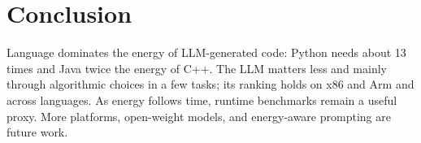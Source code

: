 \section{Conclusion}
\label{sec:conclusion}

Language dominates the energy of LLM-generated code: Python needs about 13 times and Java
twice the energy of C++. The LLM matters less and mainly through algorithmic choices in a
few tasks; its ranking holds on x86 and Arm and across languages. As energy follows time,
runtime benchmarks remain a useful proxy. More platforms, open-weight models, and
energy-aware prompting are future work.
